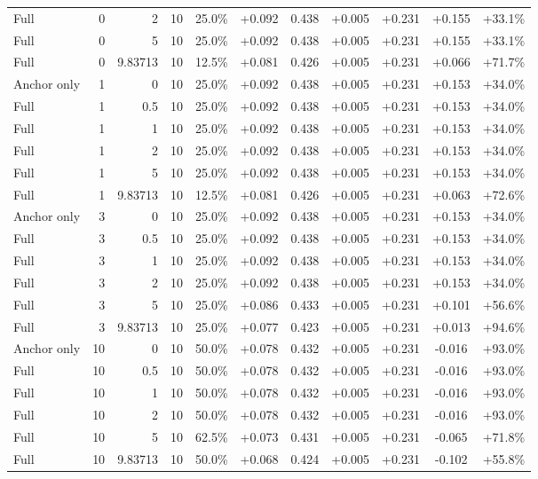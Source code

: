 \begin{table}[htbp]
\begin{tabular}{lrrrccccccc}
Full & 0 & 2 & 10 & 25.0\% & +0.092 & 0.438 & +0.005 & +0.231 & +0.155 & +33.1\% \\
Full & 0 & 5 & 10 & 25.0\% & +0.092 & 0.438 & +0.005 & +0.231 & +0.155 & +33.1\% \\
Full & 0 & 9.83713 & 10 & 12.5\% & +0.081 & 0.426 & +0.005 & +0.231 & +0.066 & +71.7\% \\
Anchor only & 1 & 0 & 10 & 25.0\% & +0.092 & 0.438 & +0.005 & +0.231 & +0.153 & +34.0\% \\
Full & 1 & 0.5 & 10 & 25.0\% & +0.092 & 0.438 & +0.005 & +0.231 & +0.153 & +34.0\% \\
Full & 1 & 1 & 10 & 25.0\% & +0.092 & 0.438 & +0.005 & +0.231 & +0.153 & +34.0\% \\
Full & 1 & 2 & 10 & 25.0\% & +0.092 & 0.438 & +0.005 & +0.231 & +0.153 & +34.0\% \\
Full & 1 & 5 & 10 & 25.0\% & +0.092 & 0.438 & +0.005 & +0.231 & +0.153 & +34.0\% \\
Full & 1 & 9.83713 & 10 & 12.5\% & +0.081 & 0.426 & +0.005 & +0.231 & +0.063 & +72.6\% \\
Anchor only & 3 & 0 & 10 & 25.0\% & +0.092 & 0.438 & +0.005 & +0.231 & +0.153 & +34.0\% \\
Full & 3 & 0.5 & 10 & 25.0\% & +0.092 & 0.438 & +0.005 & +0.231 & +0.153 & +34.0\% \\
Full & 3 & 1 & 10 & 25.0\% & +0.092 & 0.438 & +0.005 & +0.231 & +0.153 & +34.0\% \\
Full & 3 & 2 & 10 & 25.0\% & +0.092 & 0.438 & +0.005 & +0.231 & +0.153 & +34.0\% \\
Full & 3 & 5 & 10 & 25.0\% & +0.086 & 0.433 & +0.005 & +0.231 & +0.101 & +56.6\% \\
Full & 3 & 9.83713 & 10 & 25.0\% & +0.077 & 0.423 & +0.005 & +0.231 & +0.013 & +94.6\% \\
Anchor only & 10 & 0 & 10 & 50.0\% & +0.078 & 0.432 & +0.005 & +0.231 & -0.016 & +93.0\% \\
Full & 10 & 0.5 & 10 & 50.0\% & +0.078 & 0.432 & +0.005 & +0.231 & -0.016 & +93.0\% \\
Full & 10 & 1 & 10 & 50.0\% & +0.078 & 0.432 & +0.005 & +0.231 & -0.016 & +93.0\% \\
Full & 10 & 2 & 10 & 50.0\% & +0.078 & 0.432 & +0.005 & +0.231 & -0.016 & +93.0\% \\
Full & 10 & 5 & 10 & 62.5\% & +0.073 & 0.431 & +0.005 & +0.231 & -0.065 & +71.8\% \\
Full & 10 & 9.83713 & 10 & 50.0\% & +0.068 & 0.424 & +0.005 & +0.231 & -0.102 & +55.8\% \\

\end{tabular}
\end{table}
